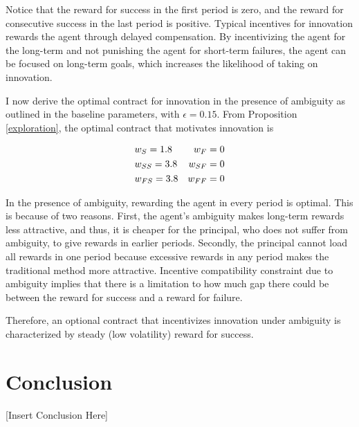 \documentclass[11pt]{article} %
\theoremstyle{exampstyle}
\newcommand{\eq}[1]{\begin{align}#1\end{align}}
\begin{document}
Notice that the reward for success in the first period is zero, and the reward for consecutive success in the last period is positive. Typical incentives for innovation rewards the agent through delayed compensation. By incentivizing the agent for the long-term and not punishing the agent for short-term failures, the agent can be focused on long-term goals, which increases the likelihood of taking on innovation. 

I now derive the optimal contract for innovation in the presence of ambiguity as outlined in the baseline parameters, with $\epsilon=0.15$. From Proposition \ref{exploration}, the optimal contract that motivates innovation is       

\eq{
&w_S = 1.8  &w_F=0 \notag \\
&w_{SS} = 3.8  &w_{SF}=0 \notag \\
&w_{FS} = 3.8 &w_{FF}=0 \notag 
}

In the presence of ambiguity, rewarding the agent in every period is optimal. This is because of two reasons. First, the agent's ambiguity makes long-term rewards less attractive, and thus, it is cheaper for the principal, who does not suffer from ambiguity, to give rewards in earlier periods. Secondly, the principal cannot load all rewards in one period because excessive rewards in any period makes the traditional method more attractive. Incentive compatibility constraint due to ambiguity implies that there is a limitation to how much gap there could be between the reward for success and a reward for failure. 

Therefore, an optional contract that incentivizes innovation under ambiguity is characterized by steady (low volatility) reward for success. 

 


\section{Conclusion}

[Insert Conclusion Here]




\newpage
\nocite{*}


\end{document}
